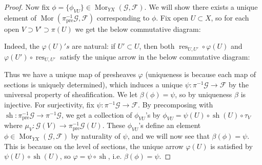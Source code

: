 \documentclass{article}
\newcommand{\fF}{\mathscr{F}}
\newcommand{\fG}{\mathscr{G}}
\DeclareMathOperator{\pre}{pre}
\DeclareMathOperator{\res}{res}
\DeclareMathOperator{\Mor}{Mor}
\DeclareMathOperator{\sh}{sh}
\begin{document}
\begin{proof}
    Now fix $\phi =\{\phi_{VU}\} \in \Mor_{YX}(\fG,\fF)$. We will show there exists a unique element of $\Mor(\pi^{-1}_{\pre} \fG,\fF)$ corresponding to $\phi$. Fix open $U\subset X$, so for each open $V\supset V'\supset \pi(U)$ we get the below commutative diagram:
    \begin{center}
    \end{center}
    Indeed, the $\varphi(U)'s$ are natural: if $U'\subset U$, then both $\res_{U,U'}\circ \varphi(U)$ and $\varphi(U')\circ \res_{U,U'}$ satisfy the unique arrow in the below commutative diagram:
    \begin{center}
    \end{center}
    Thus we have a unique map of presheaves $\varphi$ (uniqueness is because each map of sections is uniquely determined), which induces a unique $\psi:\pi^{-1}\fG \to \fF$ by the universal property of sheafification. We let $\beta(\phi) = \psi$, so by uniqueness $\beta$ is injective. For surjectivity, fix $\psi:\pi^{-1} \fG\to \fF$. By precomposing with $\sh:\pi^{-1}_{\pre}\fG \to \pi^{-1} \fG$, we get a collection of $\phi_{VU}$'s by $\phi_{VU}=\psi(U)\circ \sh(U) \circ \tau_V$ where $\mu_V:\fG(V)\to \pi^{-1}_{\pre} \fG(U)$. These $\phi_{VU}$'s define an element $\phi \in \Mor_{YX}(\fG,\fF)$ by naturality of $\psi$, and we will now see that $\beta(\phi)=\psi$. This is because on the level of sections, the unique arrow $\varphi(U)$ is satisfied by $\psi(U)\circ \sh(U)$, so $\varphi = \psi \circ \sh$, i.e. $\beta(\phi)=\psi$.


\end{proof}
\end{document}
